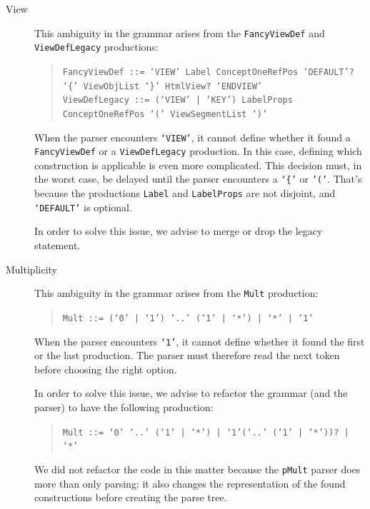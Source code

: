 \begin{description}
  \item[View]
    This ambiguity in the grammar arises from the \texttt{FancyViewDef} and \texttt{ViewDefLegacy} productions:
    \begin{quote}
        \texttt{FancyViewDef ::= `VIEW' Label ConceptOneRefPos `DEFAULT'? `\{' ViewObjList `\}' HtmlView? `ENDVIEW'}\\
        \texttt{ViewDefLegacy ::= (`VIEW' | `KEY') LabelProps ConceptOneRefPos `(' ViewSegmentList `)' }
    \end{quote}
    When the parser encounters \texttt{`VIEW'}, it cannot define whether it found a \texttt{FancyViewDef} or a \texttt{ViewDefLegacy} production.
    In this case, defining which construction is applicable is even more complicated.
    This decision must, in the worst case, be delayed until the parser encounters a \texttt{`\{'} or \texttt{'('}.
    That's because the productions \texttt{Label} and \texttt{LabelProps} are not disjoint, and \texttt{`DEFAULT'} is optional.
    
    In order to solve this issue, we advise to merge or drop the legacy statement.
    
  \item[Multiplicity]
    This ambiguity in the grammar arises from the \texttt{Mult} production:
    \begin{quote}
        \texttt{Mult ::= (`0' | `1') `..' (`1' | `*') | `*' | `1'}
    \end{quote}
    When the parser encounters \texttt{`1'}, it cannot define whether it found the first or the last production.
    The parser must therefore read the next token before choosing the right option.
    
    In order to solve this issue, we advise to refactor the grammar (and the parser) to have the following production:
    \begin{quote}
        \texttt{Mult ::= `0' `..' (`1' | `*') | `1'(`..' (`1' | `*'))? | `*'}
    \end{quote}
    We did not refactor the code in this matter because the \texttt{pMult} parser does more than only parsing: it also changes the representation of the found constructions before creating the parse tree.
  

\end{description}
